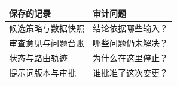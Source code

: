 \begin{tabular}{@{}P{4.0cm}P{8.5cm}@{}}
\toprule
\textbf{保存的记录} & \textbf{审计问题} \\
\midrule
候选策略与数据快照 & 结论依据哪些输入？ \\
审查意见与问题台账 & 哪些问题仍未解决？ \\
状态与路由轨迹 & 为什么在这里停止？ \\
提示词版本与审批 & 谁批准了这次变更？ \\
\bottomrule
\end{tabular}
